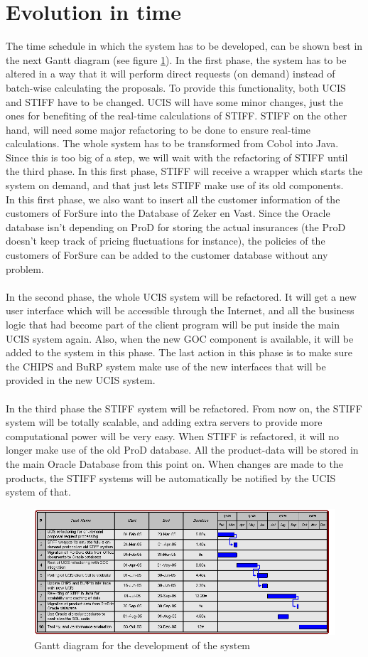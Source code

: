 \section{Evolution in time}
The time schedule in which the system has to be developed, can be shown best in the next Gantt 
diagram (see figure \ref{fig:gantt}). In the first phase, the system has to be altered in a way 
that it will perform direct requests (on demand) instead of batch-wise calculating the proposals.
To provide this functionality, both UCIS and STIFF have to be changed. UCIS will have some minor
changes, just the ones for benefiting of the real-time calculations of STIFF. STIFF on the 
other hand, will need some major refactoring to be done to ensure real-time calculations. The
whole system has to be transformed from Cobol into Java. Since this is too big of a step, we will
wait with the refactoring of STIFF until the third phase. In this first phase, STIFF will receive
a wrapper which starts the system on demand, and that just lets STIFF make use of its old components.\\
In this first phase, we also want to insert all the customer information of the customers of ForSure
into the Database of Zeker en Vast. Since the Oracle database isn't depending on ProD for storing
the actual insurances (the ProD doesn't keep track of pricing fluctuations for instance), 
the policies of the customers of ForSure can be added to the customer database without any problem.\\
 \\
In the second phase, the whole UCIS system will be refactored. It will get a new user interface
which will be accessible through the Internet, and all the business logic that had become part
of the client program will be put inside the main UCIS system again. Also, when the new GOC 
component is available, it will be added to the system in this phase. The last action in this
phase is to make sure the CHIPS and BuRP system make use of the new interfaces that will be 
provided in the new UCIS system.\\
 \\
In the third phase the STIFF system will be refactored. From now on, the STIFF system will be
totally scalable, and adding extra servers to provide more computational power will be very easy.
When STIFF is refactored, it will no longer make use of the old ProD database. All the product-data
will be stored in the main Oracle Database from this point on. When changes are made to the 
products, the STIFF systems will be automatically be notified by the UCIS system of that.


\begin{figure}[ht]
	\centering
		\includegraphics[width=1.00\textwidth]{img/gantt.png}
	\caption{Gantt diagram for the development of the system}
	\label{fig:gantt}
\end{figure}
